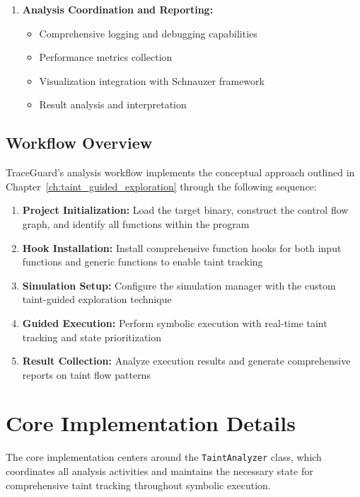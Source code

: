 \begin{enumerate}
    \item \textbf{Analysis Coordination and Reporting:}
        \begin{itemize}
            \item Comprehensive logging and debugging capabilities
            \item Performance metrics collection
            \item Visualization integration with Schnauzer framework
            \item Result analysis and interpretation
        \end{itemize}
\end{enumerate}

\subsection{Workflow Overview}

TraceGuard's analysis workflow implements the conceptual approach outlined in Chapter~\ref{ch:taint_guided_exploration} through the following sequence:

\begin{enumerate}
    \item \textbf{Project Initialization:} Load the target binary, construct the control flow graph, and identify all functions within the program
    \item \textbf{Hook Installation:} Install comprehensive function hooks for both input functions and generic functions to enable taint tracking
    \item \textbf{Simulation Setup:} Configure the simulation manager with the custom taint-guided exploration technique
    \item \textbf{Guided Execution:} Perform symbolic execution with real-time taint tracking and state prioritization
    \item \textbf{Result Collection:} Analyze execution results and generate comprehensive reports on taint flow patterns
\end{enumerate}

\section{Core Implementation Details}\label{sec:core_implementation}

The core implementation centers around the \texttt{TaintAnalyzer} class, which coordinates all analysis activities and maintains the necessary state for comprehensive taint tracking throughout symbolic execution.

